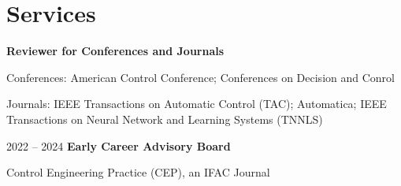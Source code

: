 \section{Services}
\begin{twocolentry}{}
\textbf{Reviewer for Conferences and Journals}\end{twocolentry}
\vspace{0.10 cm}
\begin{onecolentry}
\begin{highlights}
\item Conferences: American Control Conference; Conferences on Decision and Conrol
\item Journals: IEEE Transactions on Automatic Control (TAC); Automatica; IEEE Transactions on Neural Network and Learning Systems (TNNLS)
\end{highlights}
\end{onecolentry}
\vspace{0.20 cm}


\begin{twocolentry}{2022 -- 2024}
\textbf{Early Career Advisory Board}\end{twocolentry}
\vspace{0.10 cm}
\begin{onecolentry}
\begin{highlights}
\item Control Engineering Practice (CEP), an IFAC Journal
\end{highlights}
\end{onecolentry}
\vspace{0.20 cm}
